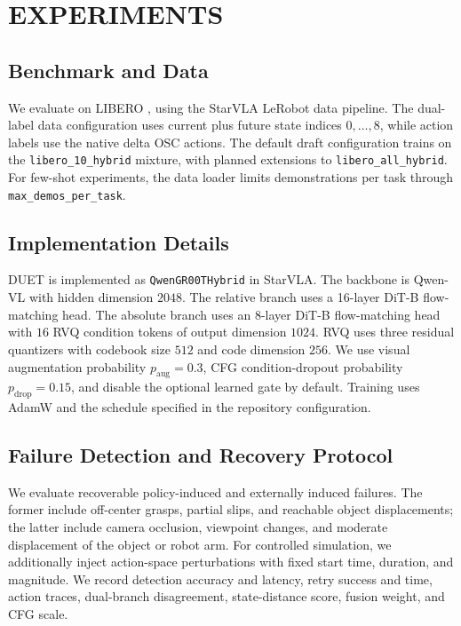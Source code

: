 \documentclass[letterpaper, 10 pt, conference]{ieeeconf}
\begin{document}
\section{EXPERIMENTS}

\subsection{Benchmark and Data}
We evaluate on LIBERO \cite{libero}, using the StarVLA LeRobot data pipeline. The dual-label data configuration uses current plus future state indices $0,\ldots,8$, while action labels use the native delta OSC actions. The default draft configuration trains on the \texttt{libero\_10\_hybrid} mixture, with planned extensions to \texttt{libero\_all\_hybrid}. For few-shot experiments, the data loader limits demonstrations per task through \texttt{max\_demos\_per\_task}.

\subsection{Implementation Details}
DUET is implemented as \texttt{QwenGR00THybrid} in StarVLA. The backbone is Qwen-VL with hidden dimension $2048$. The relative branch uses a 16-layer DiT-B flow-matching head. The absolute branch uses an 8-layer DiT-B flow-matching head with $16$ RVQ condition tokens of output dimension $1024$. RVQ uses three residual quantizers with codebook size $512$ and code dimension $256$. We use visual augmentation probability $p_{\mathrm{aug}}=0.3$, CFG condition-dropout probability $p_{\mathrm{drop}}=0.15$, and disable the optional learned gate by default. Training uses AdamW and the schedule specified in the repository configuration.

\subsection{Failure Detection and Recovery Protocol}
We evaluate recoverable policy-induced and externally induced failures. The former include off-center grasps, partial slips, and reachable object displacements; the latter include camera occlusion, viewpoint changes, and moderate displacement of the object or robot arm. For controlled simulation, we additionally inject action-space perturbations with fixed start time, duration, and magnitude. We record detection accuracy and latency, retry success and time, action traces, dual-branch disagreement, state-distance score, fusion weight, and CFG scale.
\end{document}
